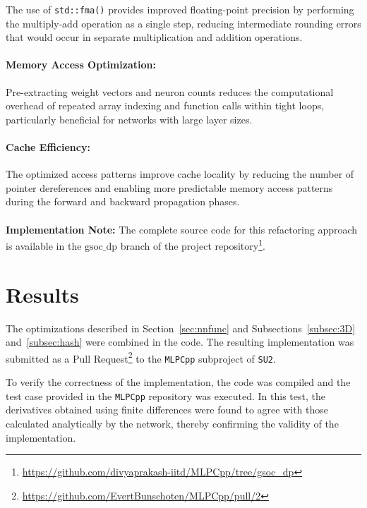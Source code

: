 \documentclass{article}
\begin{document}

The use of \texttt{std::fma()} provides improved floating-point precision by performing the multiply-add operation as a single step, reducing intermediate rounding errors that would occur in separate multiplication and addition operations.

\paragraph{Memory Access Optimization:}
Pre-extracting weight vectors and neuron counts reduces the computational overhead of repeated array indexing and function calls within tight loops, particularly beneficial for networks with large layer sizes.

\paragraph{Cache Efficiency:}
The optimized access patterns improve cache locality by reducing the number of pointer dereferences and enabling more predictable memory access patterns during the forward and backward propagation phases.
\\
\\
\noindent\textbf{Implementation Note:} The complete source code for this refactoring approach is available in the \texttt{$\text{gsoc\_dp}$} branch of the project repository\footnote{\url{https://github.com/divyaprakash-iitd/MLPCpp/tree/gsoc_dp}}.

\section{Results}
\label{sec:results}

The optimizations described in Section~\ref{sec:nnfunc} and 
Subsections~\ref{subsec:3D} and~\ref{subsec:hash} were combined in the code. 
The resulting implementation was submitted as a Pull Request\footnote{\url{https://github.com/EvertBunschoten/MLPCpp/pull/2}} 
to the \texttt{MLPCpp} subproject of \texttt{SU2}. 

To verify the correctness of the implementation, the code was compiled and the 
test case provided in the \texttt{MLPCpp} repository was executed. In this test, 
the derivatives obtained using finite differences were found to agree with those 
calculated analytically by the network, thereby confirming the validity of the implementation.
\end{document}
